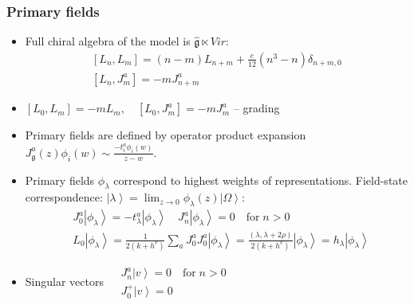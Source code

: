 \documentclass[pdftex]{beamer}
\newcommand{\gf}{\mathfrak{g}}
\newcommand{\gfh}{\hat{\mathfrak{g}}}
\theoremstyle{definition} \newtheorem{Def}{Definition}
\begin{document}
\begin{frame}
  \frametitle{Primary fields}
  \begin{itemize}
  \item Full chiral algebra of the model is $\gfh \ltimes Vir$:
    \begin{equation}
      \label{eq:92}
      \begin{aligned}
        \left[L_n,L_m\right]=(n-m)L_{n+m}+\frac{c}{12}(n^3-n)\delta_{n+m,0}\\
        \left[L_n,J^a_m\right]=-mJ^a_{n+m}
      \end{aligned}
    \end{equation}
  \item $\left[L_{0},L_{m}\right]=-m L_{m},\quad \left[L_{0},J^{a}_{m}\right]=-m J^{a}_{m}$ \quad-- grading
  \item Primary fields are defined by operator product expansion $J_{\gf}^{a}(z)\phi_{i}(w)\sim \frac{-t^{a}_{i}\phi_{i}(w)}{z-w}$.
  \item Primary fields $\phi_{\lambda}$ correspond to highest weights of representations. Field-state correspondence: $\left|\lambda\right>=\lim_{z\to 0}\phi_{\lambda}(z)\left|\Omega\right>$:
    \begin{equation*}
      \begin{aligned}
        & J_0^a\left|\phi_{\lambda}\right>=-t^a_{\lambda}\left|\phi_{\lambda}\right>  \quad    J^a_n\left|\phi_{\lambda}\right>=0 \quad \mbox{for}\; n>0 \\
        & L_0\left|\phi_{\lambda}\right>=\frac{1}{2(k+h^v)}\sum_aJ^a_0J^a_0\left|\phi_{\lambda}\right>=\frac{(\lambda,\lambda+2\rho)}{2(k+h^v)}\left|\phi_{\lambda}\right>=h_{\lambda} \left|\phi_{\lambda}\right>
      \end{aligned}
    \end{equation*}

  \item Singular vectors
$
    \begin{aligned}
      &J^a_n\left|v \right>=0 \quad \mbox{for}\; n>0 \\
      & J^{+}_{0} \left|v \right>=0
    \end{aligned}
    $
  \end{itemize}
\end{frame}
\end{document}
